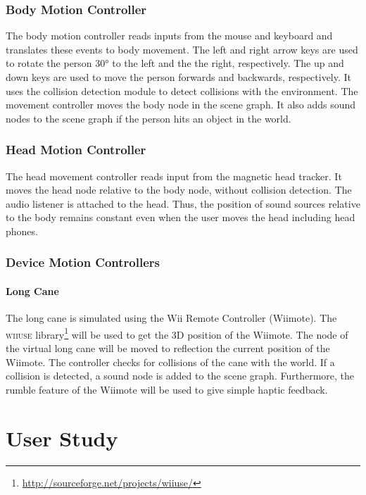 \documentclass{article}
\begin{document}
\subsubsection{Body Motion Controller}

The body motion controller reads inputs from the mouse and keyboard and
translates these events to body movement. The left and right arrow keys are used
to rotate the person \ang{30} to the left and the the right, respectively.
The up and down keys are used to move the person forwards and backwards,
respectively. It uses the collision detection module to detect collisions with
the environment. The movement controller moves the body node in the scene graph.
It also adds sound nodes to the scene graph if the person hits an object in the
world.

\subsubsection{Head Motion Controller}

The head movement controller reads input from the magnetic head tracker. It
moves the head node relative to the body node, without collision detection. The
audio listener is attached to the head. Thus, the position of sound sources
relative to the body remains constant even when the user moves the head
including head phones.

\subsubsection{Device Motion Controllers}

\paragraph{Long Cane} The long cane is simulated using the Wii Remote Controller
(Wiimote). The \textsc{wiiuse}
library\footnote{\url{http://sourceforge.net/projects/wiiuse/}} will be used to
get the 3D position of the Wiimote. The node of the virtual long cane will be
moved to reflection the current position of the Wiimote. The controller checks
for collisions of the cane with the world. If a collision is detected, a sound
node is added to the scene graph. Furthermore, the rumble feature of the Wiimote
will be used to give simple haptic feedback.

\newpage

\section{User Study}
\end{document}
